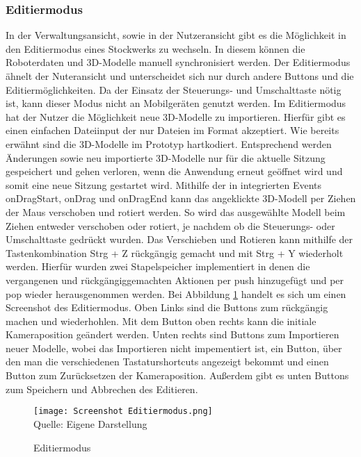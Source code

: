 \subsubsection{Editiermodus}
In der Verwaltungsansicht, sowie in der Nutzeransicht gibt es die Möglichkeit in den Editiermodus eines Stockwerks zu wechseln. In diesem können die Roboterdaten und 3D-Modelle manuell synchronisiert werden. Der Editiermodus ähnelt der Nuteransicht und unterscheidet sich nur durch andere Buttons und die Editiermöglichkeiten. Da der Einsatz der Steuerungs- und Umschalttaste nötig ist, kann dieser Modus nicht an Mobilgeräten genutzt werden. Im Editiermodus hat der Nutzer die Möglichkeit neue 3D-Modelle zu importieren. Hierfür gibt es einen einfachen Dateiinput der nur Dateien im \glb{} Format akzeptiert. Wie bereits erwähnt sind die 3D-Modelle im Prototyp hartkodiert. Entsprechend werden Änderungen sowie neu importierte 3D-Modelle nur für die aktuelle Sitzung gespeichert und gehen verloren, wenn die Anwendung erneut geöffnet wird und somit eine neue Sitzung gestartet wird. Mithilfe der in \deckgl{} integrierten Events onDragStart, onDrag und onDragEnd \cite{DeckglInteractivity} kann das angeklickte 3D-Modell per Ziehen der Maus verschoben und rotiert werden. So wird das ausgewählte Modell beim Ziehen entweder verschoben oder rotiert, je nachdem ob die Steuerungs- oder Umschalttaste gedrückt wurden. Das Verschieben und Rotieren kann mithilfe der Tastenkombination Strg + Z rückgängig gemacht und mit Strg + Y wiederholt werden. Hierfür wurden zwei Stapelspeicher implementiert in denen die vergangenen und rückgängiggemachten Aktionen per push hinzugefügt und per pop wieder herausgenommen werden. Bei Abbildung \ref{fig:EditmodeScreenshot} handelt es sich um einen Screenshot des Editiermodus. Oben Links sind die Buttons zum rückgängig machen und wiederhohlen. Mit dem Button oben rechts kann die initiale Kameraposition geändert werden. Unten rechts sind Buttons zum Importieren neuer Modelle, wobei das Importieren nicht impementiert ist, ein Button, über den man die verschiedenen Tastaturshortcuts angezeigt bekommt und einen Button zum Zurücksetzen der Kameraposition. Außerdem gibt es unten Buttons zum Speichern und Abbrechen des Editieren.

\begin{figure}[H]
    \caption{Editiermodus}\label{fig:EditmodeScreenshot}
    \texttt{[image: Screenshot Editiermodus.png]}
    \\
    Quelle: Eigene Darstellung
\end{figure}

